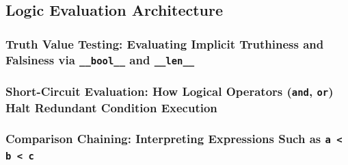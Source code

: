 \subsection{Logic Evaluation Architecture}
\subsubsection{Truth Value Testing: Evaluating Implicit Truthiness and Falsiness via \texttt{\_\_bool\_\_} and \texttt{\_\_len\_\_}}
\subsubsection{Short-Circuit Evaluation: How Logical Operators (\texttt{and}, \texttt{or}) Halt Redundant Condition Execution}
\subsubsection{Comparison Chaining: Interpreting Expressions Such as \texttt{a < b < c}}
